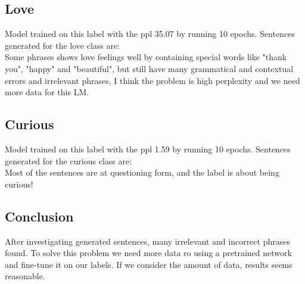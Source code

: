 \documentclass[a4paper]{article}
\begin{document}
\subsection{Love}
Model trained on this label with the ppl 35.07 by running 10 epochs. Sentences generated for the love class are:\\

Some phrases shows love feelings well by containing special words like "thank you", "happy" and "beautiful", but still have many grammatical and contextual errors and irrelevant phrases, I think the problem is high perplexity and we need more data for this LM.\\
\subsection{Curious}
Model trained on this label with the ppl 1.59 by running 10 epochs. Sentences generated for the curious class are:\\

Most of the sentences are at questioning form, and the label is about being curious!\\
\subsection{Conclusion}
After investigating generated sentences, many irrelevant and incorrect phrases found. To solve this problem we need more data ro using a pretrained network and fine-tune it on our labels. If we consider the amount of data, results seems reasonable.\pagebreak
\end{document}
